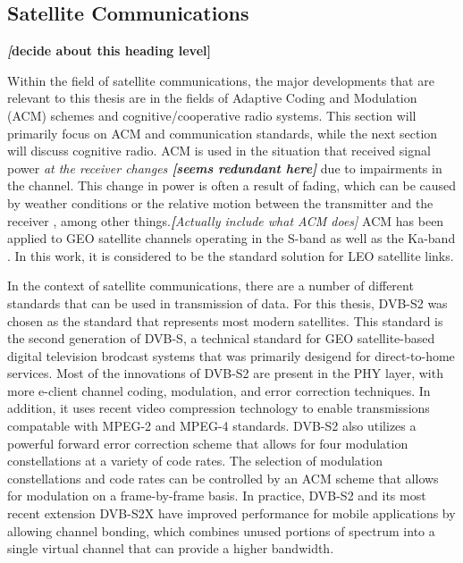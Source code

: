 \subsection{Satellite Communications} \textbf{\textit[decide about this heading level]}
\par Within the field of satellite communications, the major developments that are relevant to this thesis are in the fields of Adaptive Coding and Modulation (ACM) schemes and cognitive/cooperative radio systems. This section will primarily focus on ACM and communication standards, while the next section will discuss cognitive radio. ACM is used in the situation that received signal power \textit{at the receiver changes \textbf{[seems redundant here]}} due to impairments in the channel. This change in power is often a result of fading, which can be caused by weather conditions or the relative motion between the transmitter and the receiver \cite{paulo17}, among other things.\textit{\textbf[Actually include what ACM does]} ACM has been applied to GEO satellite channels operating in the S-band \cite{paulo18} as well as the Ka-band \cite{paulo19}. In this work, it is considered to be the standard solution for LEO satellite links.  
\par In the context of satellite communications, there are a number of different standards that can be used in transmission of data. For this thesis, DVB-S2 \cite{paulo21} was chosen as the standard that represents most modern satellites. This standard is the second generation of DVB-S, a technical standard for GEO satellite-based digital television brodcast systems that was primarily desigend for direct-to-home services. Most of the innovations of DVB-S2 are present in the PHY layer, with more e-client channel coding, modulation, and error correction techniques. In addition, it uses recent video compression technology to enable transmissions compatable with MPEG-2 and MPEG-4 standards. DVB-S2 also utilizes a powerful forward error correction scheme that allows for four modulation constellations at a variety of code rates. The selection of modulation constellations and code rates can be controlled by an ACM scheme that allows for modulation on a frame-by-frame basis. In practice, DVB-S2 and its most recent extension DVB-S2X \cite{paulo22} have improved performance for mobile applications by allowing channel bonding, which combines unused portions of spectrum into a single virtual channel that can provide a higher bandwidth.
